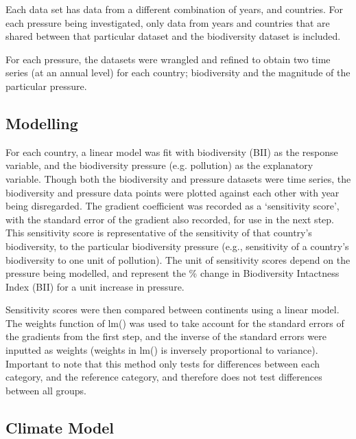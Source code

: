 \documentclass[11pt, a4paper, titlepage]{article}
\begin{document}
	Each data set has data from a different combination of years, and countries. For each pressure being investigated, only data from years and countries that are shared between that particular dataset and the biodiversity dataset is included. \newline
	
	For each pressure, the datasets were wrangled and refined to obtain two time series (at an annual level) for each country; biodiversity and the magnitude of the particular pressure.
	
	
	\subsection*{Modelling}
	
	For each country, a linear model was fit with biodiversity (BII) as the response variable, and the biodiversity pressure (e.g. pollution) as the explanatory variable. Though both the biodiversity and pressure datasets were time series, the biodiversity and pressure data points were plotted against each other with year being disregarded. The gradient coefficient was recorded as a `sensitivity score', with the standard error of the gradient also recorded, for use in the next step. This sensitivity score is representative of the sensitivity of that country's biodiversity, to the particular biodiversity pressure (e.g., sensitivity of a country's biodiversity to one unit of pollution). The unit of sensitivity scores depend on the pressure being modelled, and represent the \% change in Biodiversity Intactness Index (BII) for a unit increase in pressure. \newline
	

	Sensitivity scores were then compared between continents using a linear model. The weights function of lm() was used to take account for the standard errors of the gradients from the first step, and the inverse of the standard errors were inputted as weights (weights in lm() is inversely proportional to variance). Important to note that this method only tests for differences between each category, and the reference category, and therefore does not test differences between all groups.  \newline
	
	\subsection*{Climate Model}
	
\end{document}

